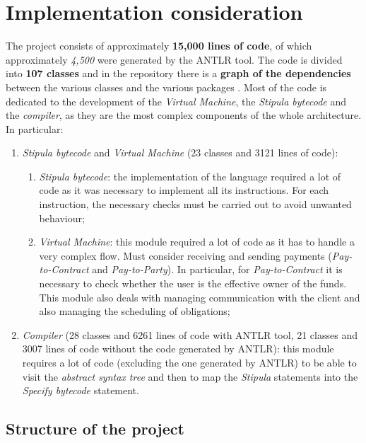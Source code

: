 \section{Implementation consideration}

The project consists of approximately \textbf{15,000 lines of code}, of which approximately \textit{4,500} 
were generated by the ANTLR tool. The code is divided into \textbf{107 classes} and in the repository there 
is a \textbf{graph of the dependencies} between the various classes and the various packages 
\autocite{site:stipula-github-graph-dependencies}. Most of the code is dedicated to the development of the 
\textit{Virtual Machine}, the \textit{Stipula bytecode} and the \textit{compiler}, as they are the most 
complex components of the whole architecture. In particular:
\begin{enumerate}
  \item \textit{Stipula bytecode} and \textit{Virtual Machine} (23 classes and 3121 lines of code):
  \begin{enumerate}
    \item \textit{Stipula bytecode}: the implementation of the language required a lot of code as it was 
    necessary to implement all its instructions. For each instruction, the necessary checks must be carried 
    out to avoid unwanted behaviour;
    \item \textit{Virtual Machine}: this module required a lot of code as it has to handle a very complex 
    flow. Must consider receiving and sending payments (\textit{Pay-to-Contract} and \textit{Pay-to-Party}). 
    In particular, for \textit{Pay-to-Contract} it is necessary to check whether the user is the effective 
    owner of the funds. This module also deals with managing communication with the client and also managing 
    the scheduling of obligations;
  \end{enumerate}
  \item \textit{Compiler} (28 classes and 6261 lines of code with ANTLR tool, 21 classes and 3007 lines of 
  code without the code generated by ANTLR): this module requires a lot of code 
  (excluding the one generated by ANTLR) to be able to visit the \textit{abstract syntax tree} and then to 
  map the \textit{Stipula} statements into the \textit{Specify bytecode} statement.
\end{enumerate}

\subsection{Structure of the project}


